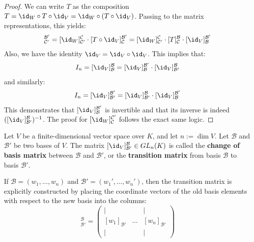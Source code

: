 \begin{proof}
We can write $T$ as the composition $T = \id_W \circ T \circ \id_V = \id_W \circ (T \circ \id_V)$. Passing to the matrix representations, this yields:
\begin{equation*}
    [T]_{\mathcal{C}'}^{\mathcal{B}'} = [\id_W]_{\mathcal{C}'}^{\mathcal{C}} \cdot [T \circ \id_V]_{\mathcal{C}}^{\mathcal{B}'} = [\id_W]_{\mathcal{C}'}^{\mathcal{C}} \cdot [T]_{\mathcal{C}}^{\mathcal{B}} \cdot [\id_V]_{\mathcal{B}}^{\mathcal{B}'}
\end{equation*}
Also, we have the identity $\id_V = \id_V \circ \id_V$. This implies that:
\begin{equation*}
    I_n = [\id_V]_{\mathcal{B}}^{\mathcal{B}} = [\id_V]_{\mathcal{B}}^{\mathcal{B}'} \cdot [\id_V]_{\mathcal{B}'}^{\mathcal{B}}
\end{equation*}
and similarly:
\begin{equation*}
    I_n = [\id_V]_{\mathcal{B}'}^{\mathcal{B}'} = [\id_V]_{\mathcal{B}'}^{\mathcal{B}} \cdot [\id_V]_{\mathcal{B}}^{\mathcal{B}'}
\end{equation*}
This demonstrates that $[\id_V]_{\mathcal{B}}^{\mathcal{B}'}$ is invertible and that its inverse is indeed $([\id_V]_{\mathcal{B}'}^{\mathcal{B}})^{-1}$. The proof for $[\id_W]_{\mathcal{C}}^{\mathcal{C}'}$ follows the exact same logic.
\end{proof}

\begin{definition}
\label{def:change_of_basis_matrix}
Let $V$ be a finite-dimensional vector space over $K$, and let $n := \dim V$. Let $\mathcal{B}$ and $\mathcal{B}'$ be two bases of $V$. The matrix $[\id_V]_{\mathcal{B}'}^{\mathcal{B}} \in GL_n(K)$ is called the \textbf{change of basis matrix} between $\mathcal{B}$ and $\mathcal{B}'$, or the \textbf{transition matrix} from basis $\mathcal{B}$ to basis $\mathcal{B}'$.
\end{definition}

\begin{remark}
If $\mathcal{B} = (w_1, \dots, w_n)$ and $\mathcal{B}' = (w_1', \dots, w_n')$, then the transition matrix is explicitly constructed by placing the coordinate vectors of the old basis elements with respect to the new basis into the columns:
\begin{equation*}
    [\id_V]_{\mathcal{B}'}^{\mathcal{B}} = \begin{pmatrix} | & & | \\ [w_1]_{\mathcal{B}'} & \dots & [w_n]_{\mathcal{B}'} \\ | & & | \end{pmatrix}
\end{equation*}
\end{remark}

